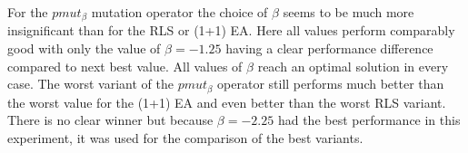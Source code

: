 For the $pmut_\beta$ mutation operator the choice of $\beta$ seems to be much more insignificant than for the RLS or (1+1) EA. Here all values perform comparably good with only the value of $\beta = -1.25$ having a clear performance difference compared to next best value. All values of $\beta$ reach an optimal solution in every case. The worst variant of the $pmut_\beta$ operator still performs much better than the worst value for the (1+1) EA and even better than the worst RLS variant. There is no clear winner but because $\beta=-2.25$ had the best performance in this experiment, it was used for the comparison of the best variants.